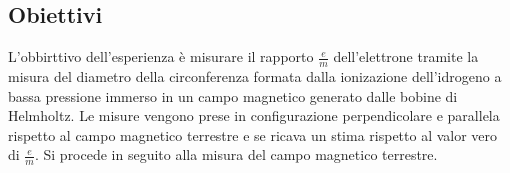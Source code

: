 \subsection{Obiettivi}
L'obbirttivo dell'esperienza è misurare il rapporto $\frac{e}{m}$ dell'elettrone tramite la misura del diametro della circonferenza formata dalla ionizazione dell'idrogeno a bassa pressione immerso in un campo magnetico generato dalle bobine di Helmholtz.
Le misure vengono prese in configurazione perpendicolare e parallela rispetto al campo magnetico terrestre e se ricava un stima rispetto al valor vero di $ \frac{e}{m}$. Si procede in seguito alla misura del campo magnetico terrestre.

